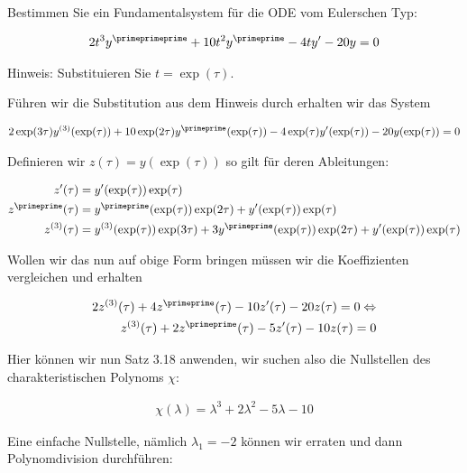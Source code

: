 \begin{exercise}
  Bestimmen Sie ein Fundamentalsystem für die ODE vom Eulerschen Typ:

  \begin{align*}
    2t^3 y^\primeprimeprime + 10t^2 y^\primeprime - 4ty^\prime - 20y = 0
  \end{align*}

  Hinweis: Substituieren Sie $t = \exp(\tau)$.
\end{exercise}

\begin{solution}
  Führen wir die Substitution aus dem Hinweis durch erhalten wir das System

  \begin{align*}
    2\exp(3\tau) y^{(3)}(\exp(\tau)) + 10\exp(2\tau) y^\primeprime (\exp(\tau))
    -4 \exp(\tau) y^\prime (\exp(\tau)) - 20 y(\exp(\tau)) = 0
  \end{align*}

  Definieren wir $z(\tau)=y(\exp(\tau))$ so gilt für deren Ableitungen:

  \begin{align*}
    z^\prime (\tau) &= y^\prime (\exp(\tau))\exp(\tau) \\
    z^\primeprime (\tau) &= y^\primeprime (\exp(\tau)) \exp(2\tau) +
    y^\prime (\exp(\tau))\exp(\tau) \\
    z^{(3)}(\tau) &= y^{(3)}(\exp(\tau)) \exp(3\tau) + 3y^\primeprime (\exp(\tau))
    \exp(2\tau) + y^\prime (\exp(\tau)) \exp(\tau)
  \end{align*}

  Wollen wir das nun auf obige Form bringen müssen wir die Koeffizienten vergleichen und erhalten

  \begin{align*}
    2z^{(3)}(\tau)+4z^\primeprime (\tau) -10 z^\prime (\tau) - 20z(\tau) = 0
    \Leftrightarrow \\
    z^{(3)}(\tau)+2z^\primeprime (\tau) -5 z^\prime (\tau) - 10z(\tau) = 0
  \end{align*}

  Hier können wir nun Satz 3.18 anwenden, wir suchen also die Nullstellen des
  charakteristischen Polynoms $\chi$:

  \begin{align*}
    \chi(\lambda) = \lambda^3 + 2\lambda^2 -5\lambda - 10
  \end{align*}

  Eine einfache Nullstelle, nämlich $\lambda _1 =-2$ können wir erraten und dann Polynomdivision
  durchführen:


\end{solution}
